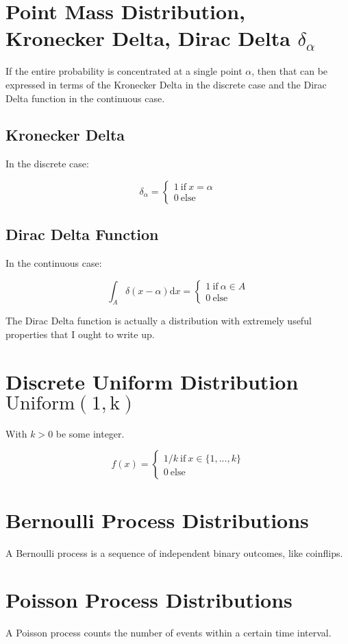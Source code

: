\section{Point Mass Distribution, Kronecker Delta, Dirac Delta $\delta_{\alpha}$}

If the entire probability is concentrated at a single point $\alpha$, then that can be expressed in terms of the Kronecker Delta in the discrete case and the Dirac Delta function in the continuous case.

\subsection{Kronecker Delta}
In the discrete case:

\begin{equation}
\delta_{\alpha} = \left\{\begin{array}{l} 1\mathrm{\ if\ }x = \alpha \\ 0\mathrm{\ else}\end{array} \right.
\end{equation}

\subsection{Dirac Delta Function}
In the continuous case:

\begin{equation}
\int_A \delta(x-\alpha) \mathrm{d}x = \left\{\begin{array}{l} 1\mathrm{\ if\ }\alpha \in A \\ 0\mathrm{\ else}\end{array} \right.
\end{equation}

The Dirac Delta function is actually a distribution with extremely useful properties that I ought to write up. 

\section{Discrete Uniform Distribution $\mathrm{Uniform(1,k)}$}

With $k>0$ be some integer.

\begin{equation}
f(x) = \left\{\begin{array}{l} 1/k \mathrm{\ if\ }x \in \{1,...,k\} \\ 0\mathrm{\ else}\end{array} \right.
\end{equation}


\section{Bernoulli Process Distributions}

A Bernoulli process is a sequence of independent binary outcomes, like coinflips.



\section{Poisson Process Distributions}

A Poisson process counts the number of events within a certain time interval. 